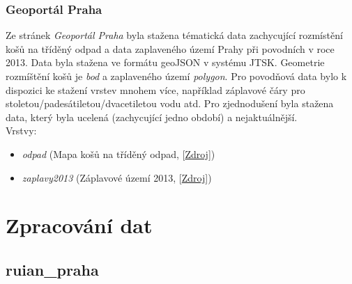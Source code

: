\documentclass[a4paper, 12pt]{article}
\begin{document}
\subsubsection{Geoportál Praha}
Ze stránek \textit{Geoportál Praha} byla stažena tématická data zachycující rozmístění košů na tříděný odpad a data zaplaveného území Prahy při povodních v roce 2013. Data byla stažena ve formátu geoJSON v systému JTSK. Geometrie rozmíštění košů je \textit{bod} a zaplaveného území \textit{polygon}. Pro povodňová data bylo k dispozici ke stažení vrstev mnohem více, například záplavové čáry pro stoletou/padesátiletou/dvacetiletou vodu atd. Pro zjednodušení byla stažena data, který byla ucelená (zachycující jedno období) a nejaktuálnější.\\

Vrstvy:
\begin{itemize}
\item \textsl{odpad} (Mapa košů na tříděný odpad, [\href{http://www.geoportalpraha.cz/cs/opendata/DBD0F925-78BF-478D-8FB8-8B3BDE9BD581#.XFDFzGlCfIV}{Zdroj}])
\item \textsl{zaplavy2013} (Záplavové území 2013, [\href{http://www.geoportalpraha.cz/cs/opendata/C121457E-5450-42D0-9009-204D8D899A06#.XE9PwWlCfIV}{Zdroj}])
\end{itemize}


\section{Zpracování dat}
\subsection{ruian\_praha}
\end{document}

